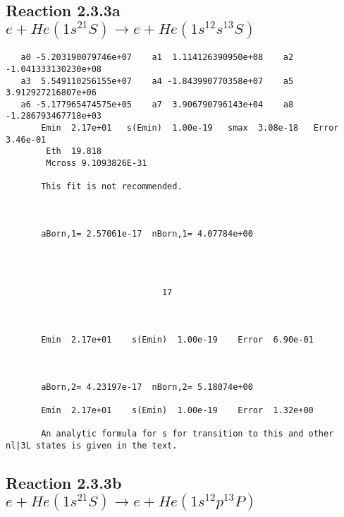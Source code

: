 \documentclass[12pt,dvipdfmx]{article}
\begin{document}
\newpage
\subsection{
Reaction 2.3.3a $e + He(1s^21S) \rightarrow e + He(1s^12s^13S)$}

















\begin{small}\begin{verbatim}
   a0 -5.203190079746e+07    a1  1.114126390950e+08    a2 -1.041333130230e+08
   a3  5.549110256155e+07    a4 -1.843990770358e+07    a5  3.912927216807e+06
   a6 -5.177965474575e+05    a7  3.906790796143e+04    a8 -1.286793467718e+03
       Emin  2.17e+01   s(Emin)  1.00e-19   smax  3.08e-18   Error  3.46e-01
        Eth  19.818
        Mcross 9.1093826E-31

       This fit is not recommended.



       aBorn,1= 2.57061e-17  nBorn,1= 4.07784e+00




                               17



       Emin  2.17e+01    s(Emin)  1.00e-19    Error  6.90e-01



       aBorn,2= 4.23197e-17  nBorn,2= 5.18074e+00

       Emin  2.17e+01    s(Emin)  1.00e-19    Error  1.32e+00

       An analytic formula for s for transition to this and other nl|3L states is given in the text.
\end{verbatim}\end{small}




\newpage
\subsection{
Reaction 2.3.3b $e + He(1s^21S) \rightarrow e + He(1s^12p^13P)$}






\end{document}
